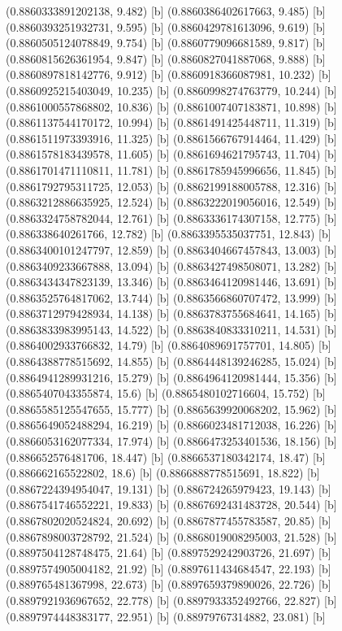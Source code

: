 {{{(0.8860333891202138, 9.482) [b] 
(0.8860386402617663, 9.485) [b] 
(0.8860393251932731, 9.595) [b] 
(0.8860429781613096, 9.619) [b] 
(0.8860505124078849, 9.754) [b] 
(0.8860779096681589, 9.817) [b] 
(0.8860815626361954, 9.847) [b] 
(0.8860827041887068, 9.888) [b] 
(0.8860897818142776, 9.912) [b] 
(0.8860918366087981, 10.232) [b] 
(0.8860925215403049, 10.235) [b] 
(0.8860998274763779, 10.244) [b] 
(0.8861000557868802, 10.836) [b] 
(0.8861007407183871, 10.898) [b] 
(0.8861137544170172, 10.994) [b] 
(0.8861491425448711, 11.319) [b] 
(0.8861511973393916, 11.325) [b] 
(0.8861566767914464, 11.429) [b] 
(0.8861578183439578, 11.605) [b] 
(0.8861694621795743, 11.704) [b] 
(0.8861701471110811, 11.781) [b] 
(0.8861785945996656, 11.845) [b] 
(0.8861792795311725, 12.053) [b] 
(0.8862199188005788, 12.316) [b] 
(0.8863212886635925, 12.524) [b] 
(0.8863222019056016, 12.549) [b] 
(0.8863324758782044, 12.761) [b] 
(0.8863336174307158, 12.775) [b] 
(0.886338640261766, 12.782) [b] 
(0.8863395535037751, 12.843) [b] 
(0.8863400101247797, 12.859) [b] 
(0.8863404667457843, 13.003) [b] 
(0.8863409233667888, 13.094) [b] 
(0.8863427498508071, 13.282) [b] 
(0.8863434347823139, 13.346) [b] 
(0.8863464120981446, 13.691) [b] 
(0.8863525764817062, 13.744) [b] 
(0.8863566860707472, 13.999) [b] 
(0.8863712979428934, 14.138) [b] 
(0.8863783755684641, 14.165) [b] 
(0.8863833983995143, 14.522) [b] 
(0.8863840833310211, 14.531) [b] 
(0.8864002933766832, 14.79) [b] 
(0.8864089691757701, 14.805) [b] 
(0.8864388778515692, 14.855) [b] 
(0.8864448139246285, 15.024) [b] 
(0.8864941289931216, 15.279) [b] 
(0.8864964120981444, 15.356) [b] 
(0.8865407043355874, 15.6) [b] 
(0.8865480102716604, 15.752) [b] 
(0.8865585125547655, 15.777) [b] 
(0.8865639920068202, 15.962) [b] 
(0.8865649052488294, 16.219) [b] 
(0.8866023481712038, 16.226) [b] 
(0.8866053162077334, 17.974) [b] 
(0.8866473253401536, 18.156) [b] 
(0.886652576481706, 18.447) [b] 
(0.8866537180342174, 18.47) [b] 
(0.886662165522802, 18.6) [b] 
(0.8866888778515691, 18.822) [b] 
(0.8867224394954047, 19.131) [b] 
(0.886724265979423, 19.143) [b] 
(0.8867541746552221, 19.833) [b] 
(0.8867692431483728, 20.544) [b] 
(0.8867802020524824, 20.692) [b] 
(0.8867877455783587, 20.85) [b] 
(0.8867898003728792, 21.524) [b] 
(0.8868019008295003, 21.528) [b] 
(0.8897504128748475, 21.64) [b] 
(0.8897529242903726, 21.697) [b] 
(0.8897574905004182, 21.92) [b] 
(0.8897611434684547, 22.193) [b] 
(0.889765481367998, 22.673) [b] 
(0.8897659379890026, 22.726) [b] 
(0.8897921936967652, 22.778) [b] 
(0.8897933352492766, 22.827) [b] 
(0.8897974448383177, 22.951) [b] 
(0.88979767314882, 23.081) [b] 
}}}
